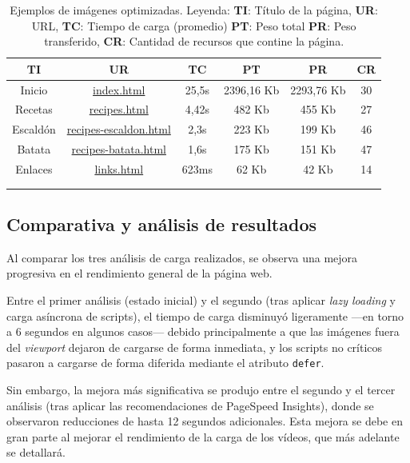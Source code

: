 \documentclass{article}
\begin{document}
\begin{longtable}{c|c|c|c|c|c}
    \hline
    \textbf{TI} & \textbf{UR} & \textbf{TC} & \textbf{PT} & \textbf{PR} & \textbf{CR} \\
    \endhead
    \hline
    Inicio & \href{https://www.danielramos.me/hhyc-dramosac/index.html}{index.html} & 25,5s & 2396,16 Kb & 2293,76 Kb & 30 \\
    Recetas & \href{https://www.danielramos.me/hhyc-dramosac/recipes.html}{recipes.html} & 4,42s & 482 Kb & 455 Kb & 27 \\
    Escaldón & \href{https://www.danielramos.me/hhyc-dramosac/recipes-escaldon.html}{recipes-escaldon.html} & 2,3s & 223 Kb & 199 Kb & 46 \\
    Batata & \href{https://www.danielramos.me/hhyc-dramosac/recipes-batata.html}{recipes-batata.html} & 1,6s & 175 Kb & 151 Kb & 47 \\
    Enlaces & \href{https://www.danielramos.me/hhyc-dramosac/links.html}{links.html} & 623ms & 62 Kb & 42 Kb & 14 \\
    \hline
     \\[1.5ex]
     \caption{
          Ejemplos de imágenes optimizadas.
          Leyenda: 
          \textbf{TI}: Título de la página, 
          \textbf{UR}: URL, 
          \textbf{TC}: Tiempo de carga (promedio) 
          \textbf{PT}: Peso total 
          \textbf{PR}: Peso transferido, 
          \textbf{CR}: Cantidad de recursos que contine la página.
     }
    \label{tab:pagespeed-insights}
\end{longtable}

\subsection{Comparativa y análisis de resultados}\label{sec:comparativa-y-analisis-de-resultados}

Al comparar los tres análisis de carga realizados, se observa una mejora progresiva en el rendimiento general de la página web.

Entre el primer análisis (estado inicial) y el segundo (tras aplicar \textit{lazy loading} y carga asíncrona de scripts), el tiempo de carga disminuyó ligeramente —en torno a 6 segundos en algunos casos— debido principalmente a que las imágenes fuera del \textit{viewport} dejaron de cargarse de forma inmediata, y los scripts no críticos pasaron a cargarse de forma diferida mediante el atributo \texttt{defer}.

Sin embargo, la mejora más significativa se produjo entre el segundo y el tercer análisis (tras aplicar las recomendaciones de PageSpeed Insights), donde se observaron reducciones de hasta 12 segundos adicionales. Esta mejora se debe en gran parte al mejorar el rendimiento de la carga de los vídeos, que más adelante se detallará.
\end{document}
